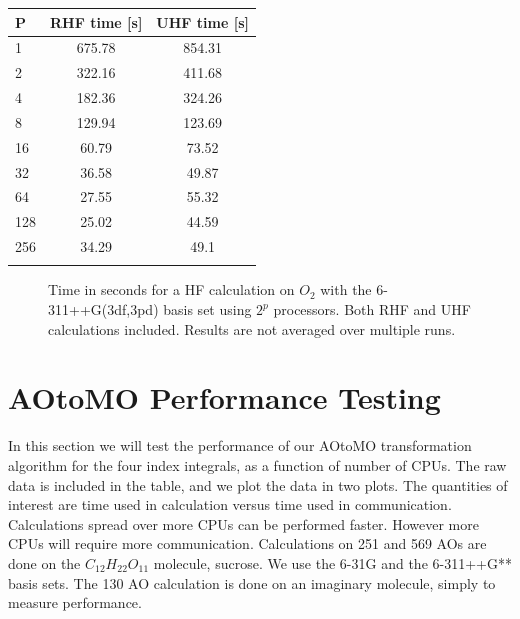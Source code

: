 \documentclass[a4paper,norsk,11pt,twoside]{report}
\begin{document}
\begin{center}
\begin{tabular}{ l c c }
	\hline
  	P & RHF time [s] & UHF time [s] \\ \hline
  	1 & 675.78 & 854.31 \\ 
  	2 & 322.16 & 411.68 \\ 
  	4 & 182.36 & 324.26 \\
  	8 & 129.94 & 123.69 \\ 
  	16 & 60.79 & 73.52 \\ 
  	32 & 36.58 & 49.87 \\ 
  	64 & 27.55 & 55.32 \\ 
  	128 & 25.02 & 44.59 \\
  	256 & 34.29 & 49.1  \\ \hline
  	\\
	\end{tabular}
\end{center}

\newpage

\begin{figure}[h!]
\begin{center}
\caption{Time in seconds for a HF calculation on $O_2$ with the 6-311++G(3df,3pd) basis set using $2^p$ processors. Both RHF and UHF calculations included. Results are not averaged over multiple runs.}
\label{fig:hf_performance_stuff_jesus1234}
\end{center}
\end{figure}


\section{AOtoMO Performance Testing \label{aotomoperformancetesting}}
In this section we will test the performance of our AOtoMO transformation algorithm for the four index integrals, as a function of number of CPUs. The raw data is included in the table, and we plot the data in two plots. The quantities of interest are time used in calculation versus time used in communication. Calculations spread over more CPUs can be performed faster. However more CPUs will require more communication. Calculations on 251 and 569 AOs are done on the $C_{12} H_{22} O_{11}$ molecule, sucrose. We use the 6-31G and the 6-311++G** basis sets. The 130 AO calculation is done on an imaginary molecule, simply to measure performance. \\
\end{document}
